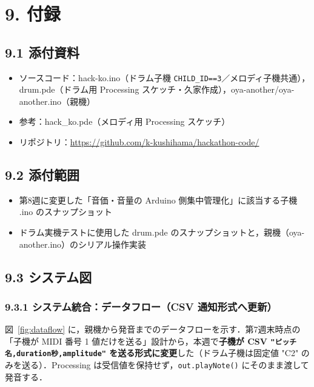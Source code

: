 \documentclass[a4paper,11pt]{ltjsarticle}
\providecommand{\％}{\%}
\begin{document}
\section{9. 付録}

\subsection*{9.1 添付資料}

\begin{itemize}
    \item ソースコード：hack-ko.ino（ドラム子機 \texttt{CHILD\_ID==3}／メロディ子機共通），drum.pde（ドラム用 Processing スケッチ・久家作成），oya-another/oya-another.ino（親機）
    \item 参考：hack\_ko.pde（メロディ用 Processing スケッチ）
    \item リポジトリ：\url{https://github.com/k-kushihama/hackathon-code/}
\end{itemize}

\subsection*{9.2 添付範囲}

\begin{itemize}
    \item 第8週に変更した「音価・音量の Arduino 側集中管理化」に該当する子機 .ino のスナップショット
    \item ドラム実機テストに使用した drum.pde のスナップショットと，親機（oya-another.ino）のシリアル操作実装
\end{itemize}

\subsection*{9.3 システム図}

\subsubsection*{9.3.1 システム統合：データフロー（CSV 通知形式へ更新）}

図~\ref{fig:dataflow} に，親機から発音までのデータフローを示す．第7週末時点の「子機が MIDI 番号 1 値だけを送る」設計から，本週で\textbf{子機が CSV \texttt{"ピッチ名,duration秒,amplitude"} を送る形式に変更}した（ドラム子機は固定値 "C2" のみを送る）．Processing は受信値を保持せず，\texttt{out.playNote()} にそのまま渡して発音する．
\end{document}

